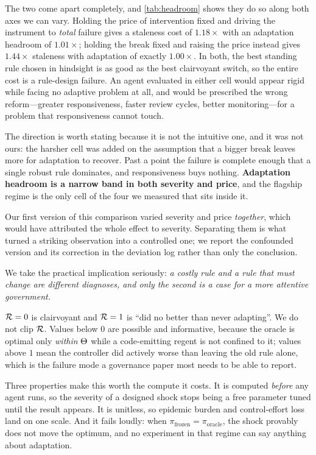 \documentclass[11pt]{article}
\begin{document}
The two come apart completely, and \cref{tab:headroom} shows they do so along both axes we can vary.
Holding the price of intervention fixed and driving the instrument to \emph{total} failure gives a
staleness cost of $1.18\times$ with an adaptation headroom of $1.01\times$; holding the break fixed
and raising the price instead gives $1.44\times$ staleness with adaptation of exactly $1.00\times$.
In both, the best standing rule chosen in hindsight is as good as the best clairvoyant switch, so
the entire cost is a rule-design failure. An agent evaluated in either cell would appear rigid while
facing no adaptive problem at all, and would be prescribed the wrong reform---greater
responsiveness, faster review cycles, better monitoring---for a problem that responsiveness cannot
touch.

The direction is worth stating because it is not the intuitive one, and it was not ours: the harsher
cell was added on the assumption that a bigger break leaves more for adaptation to recover. Past a
point the failure is complete enough that a single robust rule dominates, and responsiveness buys
nothing. \textbf{Adaptation headroom is a narrow band in both severity and price}, and the flagship
regime is the only cell of the four we measured that sits inside it.

Our first version of this comparison varied severity and price \emph{together}, which would have
attributed the whole effect to severity. Separating them is what turned a striking observation into
a controlled one; we report the confounded version and its correction in the deviation log rather
than only the conclusion.

We take the practical implication seriously: \emph{a costly rule and a rule that must change are
different diagnoses, and only the second is a case for a more attentive government.}

\medskip
$\mathcal{R} = 0$ is clairvoyant and $\mathcal{R} = 1$ is ``did no better than never adapting''. We do not clip
$\mathcal{R}$. Values below $0$ are possible and informative, because the oracle is optimal only
\emph{within} $\Theta$ while a code-emitting regent is not confined to it; values above $1$ mean
the controller did actively worse than leaving the old rule alone, which is the failure mode a
governance paper most needs to be able to report.

Three properties make this worth the compute it costs. It is computed \emph{before} any agent runs,
so the severity of a designed shock stops being a free parameter tuned until the result appears. It
is unitless, so epidemic burden and control-effort loss land on one scale. And it fails loudly:
when $\pi_{\mathrm{frozen}} = \pi_{\mathrm{oracle}}$, the shock provably does not move the optimum,
and no experiment in that regime can say anything about adaptation.
\end{document}
